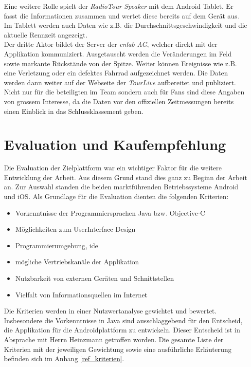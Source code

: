 Eine weitere Rolle spielt der \textit{RadioTour Speaker} mit dem Android Tablet. Er fasst die Informationen zusammen und wertet diese bereits auf dem Gerät aus. Im Tablett werden auch Daten wie z.B. die Durchschnittsgeschwindigkeit und die aktuelle Rennzeit angezeigt.
\\
Der dritte Aktor bildet der Server der \textit{cnlab AG}, welcher direkt mit der Applikation kommuniziert. Ausgetauscht werden die Veränderungen im Feld sowie markante Rückstände von der Spitze. Weiter können Ereignisse wie z.B. eine Verletzung oder ein defektes Fahrrad aufgezeichnet werden. Die Daten werden dann weiter auf der Webseite der \textit{TourLive} aufbereitet und publiziert. Nicht nur für die beteiligten im Team sondern auch für Fans sind diese Angaben von grossem Interesse, da die Daten vor den offiziellen Zeitmessungen bereits einen Einblick in das Schlussklassement geben.

\section{Evaluation und Kaufempfehlung}
Die Evaluation der Zielplattform war ein wichtiger Faktor für die weitere Entwicklung der Arbeit. Aus diesem Grund stand dies ganz zu Beginn der Arbeit an. Zur Auswahl standen die beiden marktführenden Betriebssysteme Android und iOS. Als Grundlage für die Evaluation dienten die folgenden Kriterien:
\begin{itemize}
\item Vorkenntnisse der Programmiersprachen Java bzw. Objective-C
\item Möglichkeiten zum UserInterface Design
\item Programmierumgebung, \gls{ide}
\item mögliche Vertriebskanäle der Applikation
\item Nutzbarkeit von externen Geräten und Schnittstellen
\item Vielfalt von Informationsquellen im Internet
\end{itemize}
Die Kriterien werden in einer Nutzwertanalyse gewichtet und bewertet. Insbesondere die Vorkenntnisse in Java sind  ausschlaggebend für den Entscheid, die Applikation für die Androidplattform zu entwickeln. Dieser Entscheid ist in Absprache mit Herrn Heinzmann getroffen worden. Die gesamte Liste der Kriterien mit der jeweiligen Gewichtung sowie eine ausführliche Erläuterung befinden sich im Anhang \ref{ref_kriterien}.
\\

